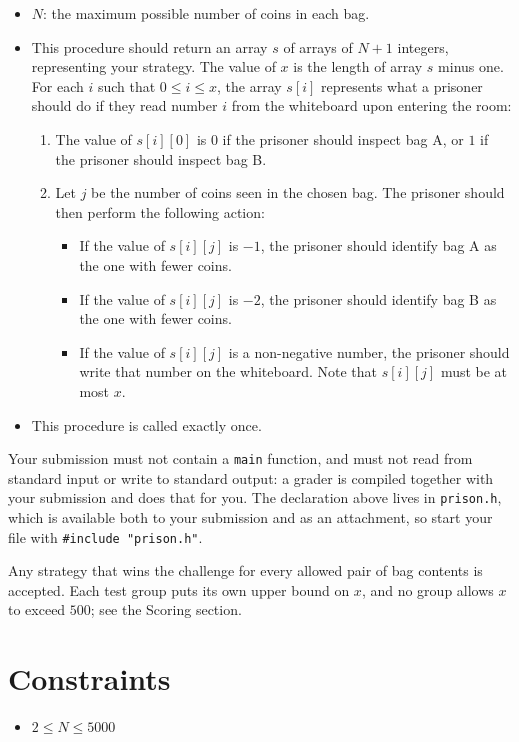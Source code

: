 \begin{itemize}
  \item $N$: the maximum possible number of coins in each bag.
  \item This procedure should return an array $s$ of arrays of $N+1$ integers, representing your
  strategy. The value of $x$ is the length of array $s$ minus one. For each $i$ such that
  $0 \leq i \leq x$, the array $s[i]$ represents what a prisoner should do if they read number $i$
  from the whiteboard upon entering the room:
  \begin{enumerate}
    \item The value of $s[i][0]$ is $0$ if the prisoner should inspect bag A, or $1$ if the prisoner
    should inspect bag B.
    \item Let $j$ be the number of coins seen in the chosen bag. The prisoner should then perform the
    following action:
    \begin{itemize}
      \item If the value of $s[i][j]$ is $-1$, the prisoner should identify bag A as the one with
      fewer coins.
      \item If the value of $s[i][j]$ is $-2$, the prisoner should identify bag B as the one with
      fewer coins.
      \item If the value of $s[i][j]$ is a non-negative number, the prisoner should write that number
      on the whiteboard. Note that $s[i][j]$ must be at most $x$.
    \end{itemize}
  \end{enumerate}
  \item This procedure is called exactly once.
\end{itemize}

Your submission must not contain a \texttt{main} function, and must not read from standard input or
write to standard output: a grader is compiled together with your submission and does that for you.
The declaration above lives in \texttt{prison.h}, which is available both to your submission and as
an attachment, so start your file with \texttt{\#include "prison.h"}.

Any strategy that wins the challenge for every allowed pair of bag contents is accepted. Each test
group puts its own upper bound on $x$, and no group allows $x$ to exceed $500$; see the Scoring
section.

\section*{Constraints}
\begin{itemize}
  \item $2 \leq N \leq 5000$
\end{itemize}

